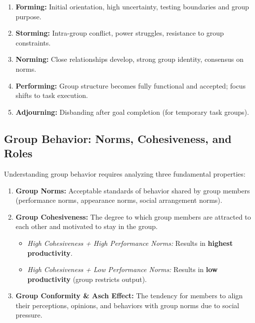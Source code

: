\documentclass[11pt,a4paper]{article}
\begin{document}
\begin{enumerate}[leftmargin=*, itemsep=3pt]
  \item \textbf{Forming:} Initial orientation, high uncertainty, testing boundaries and group purpose.
  \item \textbf{Storming:} Intra-group conflict, power struggles, resistance to group constraints.
  \item \textbf{Norming:} Close relationships develop, strong group identity, consensus on norms.
  \item \textbf{Performing:} Group structure becomes fully functional and accepted; focus shifts to task execution.
  \item \textbf{Adjourning:} Disbanding after goal completion (for temporary task groups).
\end{enumerate}

\subsection{Group Behavior: Norms, Cohesiveness, and Roles}
Understanding group behavior requires analyzing three fundamental properties:
\begin{enumerate}[leftmargin=*, itemsep=4pt]
  \item \textbf{Group Norms:} Acceptable standards of behavior shared by group members (performance norms, appearance norms, social arrangement norms).
  \item \textbf{Group Cohesiveness:} The degree to which group members are attracted to each other and motivated to stay in the group.
    \begin{itemize}[leftmargin=*, noitemsep]
      \item \textit{High Cohesiveness + High Performance Norms:} Results in \textbf{highest productivity}.
      \item \textit{High Cohesiveness + Low Performance Norms:} Results in \textbf{low productivity} (group restricts output).
    \end{itemize}
  \item \textbf{Group Conformity \& Asch Effect:} The tendency for members to align their perceptions, opinions, and behaviors with group norms due to social pressure.
\end{enumerate}

\end{document}
